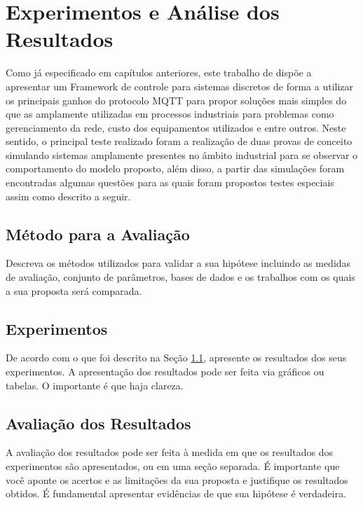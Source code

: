 \chapter[Experimentos e Análise dos Resultados]{Experimentos e Análise dos Resultados}
\label{experimentos}

Como já especificado em capítulos anteriores, este trabalho de dispõe a apresentar um Framework de 
 controle para sistemas discretos de forma a utilizar os principais ganhos do protocolo MQTT para propor soluções mais 
 simples do que as amplamente utilizadas em processos industriais para problemas como gerenciamento da rede, custo dos 
 equipamentos utilizados e entre outros. Neste sentido, o principal teste realizado foram a realização de duas provas de
 conceito simulando sistemas amplamente presentes no âmbito industrial para se observar o comportamento do modelo 
 proposto, além disso, a partir das simulações foram encontradas algumas questões para as quais foram propostos testes 
 especiais assim como descrito a seguir.

\section{Método para a Avaliação}
\label{metodo}
Descreva os métodos utilizados para validar a sua hipótese incluindo as medidas de avaliação, conjunto de parâmetros, bases de dados e os trabalhos com os quais a sua proposta será comparada.

\section{Experimentos}
De acordo com o que foi descrito na Seção \ref{metodo}, apresente os resultados dos seus experimentos. A apresentação dos resultados pode ser feita via gráficos ou tabelas. O importante é que haja clareza.


\section{Avaliação dos Resultados}
\label{avaliacao}

A avaliação dos resultados pode ser feita à medida em que os resultados dos experimentos são apresentados, ou em uma seção separada. É importante que você aponte os acertos e as limitações da sua proposta e justifique os resultados obtidos. É fundamental apresentar evidências de que sua hipótese é verdadeira.